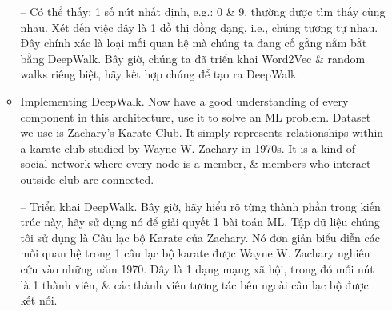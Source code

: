 \documentclass{article}
\begin{document}
\begin{itemize}
\begin{itemize}
        -- Có thể thấy: 1 số nút nhất định, e.g.: 0 \& 9, thường được tìm thấy cùng nhau. Xét đến việc đây là 1 đồ thị đồng dạng, i.e., chúng tương tự nhau. Đây chính xác là loại mối quan hệ mà chúng ta đang cố gắng nắm bắt bằng DeepWalk. Bây giờ, chúng ta đã triển khai Word2Vec \& random walks riêng biệt, hãy kết hợp chúng để tạo ra DeepWalk.
        \item {\sf Implementing DeepWalk.} Now have a good understanding of every component in this architecture, use it to solve an ML problem. Dataset we use is Zachary's Karate Club. It simply represents relationships within a karate club studied by {\sc Wayne W. Zachary} in 1970s. It is a kind of social network where every node is a member, \& members who interact outside club are connected.

        -- {\sf Triển khai DeepWalk.} Bây giờ, hãy hiểu rõ từng thành phần trong kiến trúc này, hãy sử dụng nó để giải quyết 1 bài toán ML. Tập dữ liệu chúng tôi sử dụng là Câu lạc bộ Karate của Zachary. Nó đơn giản biểu diễn các mối quan hệ trong 1 câu lạc bộ karate được {\sc Wayne W. Zachary} nghiên cứu vào những năm 1970. Đây là 1 dạng mạng xã hội, trong đó mỗi nút là 1 thành viên, \& các thành viên tương tác bên ngoài câu lạc bộ được kết nối.


\end{itemize}
\end{itemize}
\end{document}
